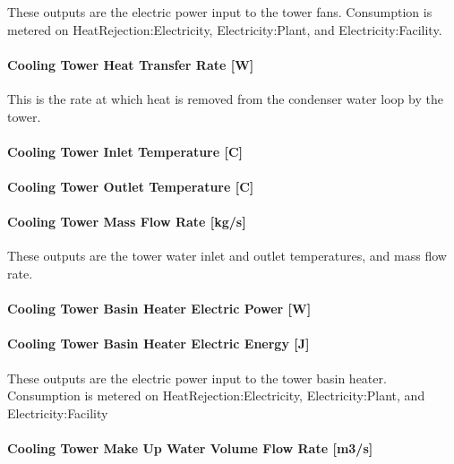 These outputs are the electric power input to the tower fans. Consumption is metered on HeatRejection:Electricity, Electricity:Plant, and Electricity:Facility.

\paragraph{Cooling Tower Heat Transfer Rate {[}W{]}}\label{cooling-tower-heat-transfer-rate-w-1}

This is the rate at which heat is removed from the condenser water loop by the tower.

\paragraph{Cooling Tower Inlet Temperature {[}C{]}}\label{cooling-tower-inlet-temperature-c-1}

\paragraph{Cooling Tower Outlet Temperature {[}C{]}}\label{cooling-tower-outlet-temperature-c-1}

\paragraph{Cooling Tower Mass Flow Rate {[}kg/s{]}}\label{cooling-tower-mass-flow-rate-kgs-1}

These outputs are the tower water inlet and outlet temperatures, and mass flow rate.

\paragraph{Cooling Tower Basin Heater Electric Power {[}W{]}}\label{cooling-tower-basin-heater-electric-power-w-1}

\paragraph{Cooling Tower Basin Heater Electric Energy {[}J{]}}\label{cooling-tower-basin-heater-electric-energy-j-1}

These outputs are the electric power input to the tower basin heater. Consumption is metered on HeatRejection:Electricity, Electricity:Plant, and Electricity:Facility

\paragraph{Cooling Tower Make Up Water Volume Flow Rate {[}m3/s{]}}\label{cooling-tower-make-up-water-volume-flow-rate-m3s-1}

